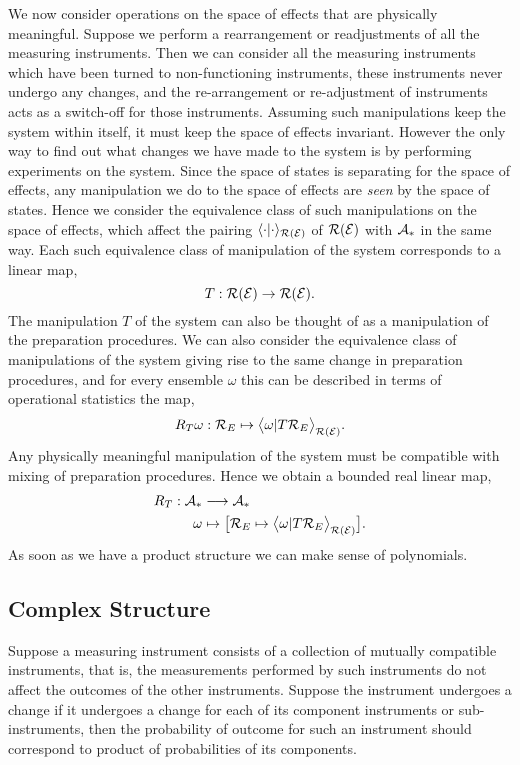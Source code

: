 \documentclass[11pt]{article}
\begin{document}
We now consider operations on the space of effects that are physically meaningful. Suppose we perform a rearrangement or readjustments of all the measuring instruments. Then we can consider all the measuring instruments which have been turned to non-functioning instruments, these instruments never undergo any changes, and the re-arrangement or re-adjustment of instruments acts as a switch-off for those instruments. Assuming such manipulations keep the system within itself, it must keep the space of effects invariant. However the only way to find out what changes we have made to the system is by performing experiments on the system. Since the space of states is separating for the space of effects, any manipulation we do to the space of effects are \emph{seen} by the space of states. Hence we consider the equivalence class of such manipulations on the space of effects, which affect the pairing $\langle \cdot| \cdot\rangle_{\mathcal{R}(\mathcal{E})}$ of $\mathcal{R}(\mathcal{E})$ with $\mathcal{A}_* $ in the same way. Each such equivalence class of manipulation of the system corresponds to a linear map,
$$T:\mathcal{R}(\mathcal{E})\to \mathcal{R}(\mathcal{E}).$$
The manipulation $T$ of the system can also be thought of as a manipulation of the preparation procedures. We can also consider the equivalence class of manipulations of the system giving rise to the same change in preparation procedures, and for every ensemble $\omega$ this can be described in terms of operational statistics the map,
$$R_T\omega: \mathcal{R}_E\mapsto\big\langle \omega|T\mathcal{R}_E\big\rangle_{\mathcal{R}(\mathcal{E})}.$$
Any physically meaningful manipulation of the system must be compatible with mixing of preparation procedures. Hence we obtain a bounded real linear map,
\begin{align*}
R_T:\mathcal{A}_*&\longrightarrow \mathcal{A}_*\\
\omega&\mapsto\big[\mathcal{R}_E\mapsto\big\langle \omega|T\mathcal{R}_E\big\rangle_{\mathcal{R}(\mathcal{E})}\big].
\end{align*}
As soon as we have a product structure we can make sense of polynomials.

\subsection*{Complex Structure}
Suppose a measuring instrument consists of a collection of mutually compatible instruments, that is, the measurements performed by such instruments do not affect the outcomes of the other instruments. Suppose the instrument undergoes a change if it undergoes a change for each of its component instruments or sub-instruments, then the probability of outcome for such an instrument should correspond to product of probabilities of its components. 
\end{document}
